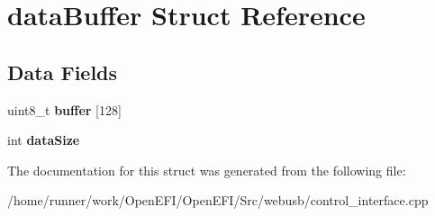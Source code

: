 \hypertarget{structdataBuffer}{}\section{data\+Buffer Struct Reference}
\label{structdataBuffer}
\subsection*{Data Fields}
\begin{DoxyCompactItemize}
\item 
\mbox{\label{structdataBuffer_af041de8abc17b52d3a87eda693121216}} 
uint8\+\_\+t {\bfseries buffer} \mbox{[}128\mbox{]}
\item 
\mbox{\label{structdataBuffer_af378ad66ff17549966ad59ac2f65ad54}} 
int {\bfseries data\+Size}
\end{DoxyCompactItemize}


The documentation for this struct was generated from the following file\+:\begin{DoxyCompactItemize}
\item 
/home/runner/work/\+Open\+E\+F\+I/\+Open\+E\+F\+I/\+Src/webusb/control\+\_\+interface.\+cpp\end{DoxyCompactItemize}
